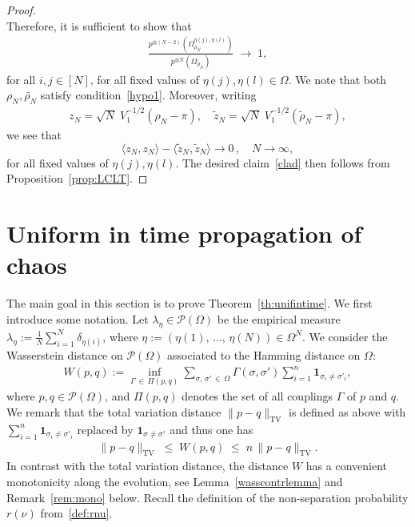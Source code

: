 \documentclass[AHL,Unicode,longabstracts,published]{cedram}
\renewcommand{\leq}{\;\leqslant\;}
\newcommand{\Om}{\Omega}
\newcommand{\si}{\sigma}
\newcommand{\scalar}[2]{\langle #1, #2\rangle}
\newcommand{\tv}{\mathrm{TV}}
\newcommand{\ind}{\mathbf{1}}
\newcommand{\cP}{\mathcal{P}}
\let\r=\rho
\let\G=\Gamma
\let\O=\Omega
\begin{document}
\begin{proof}
\[\]
Therefore, it is sufficient to show that
\begin{align}\label{clad}
\frac{p^{\otimes (N-2)}\left(\Om^{\eta(j),\eta(l)}_{\rho_N}\right)}{p^{\otimes N}\left(\Om_{\rho_N}\right)} \;\to\; 1,
\end{align}
for all $i,j \in [N]$, for all fixed values of $\eta(j),\eta(l)\in\O$. We note that both $\rho_N,\widetilde{\rho_N}$ satisfy condition~\eqref{hypo1}. Moreover, writing
\begin{gather*}
z_N =\sqrt N \;V_1^{-1/2}\left(\r_N - \pi\right),\quad
\widetilde z_N=\sqrt N \;V_1^{-1/2}\left(\widetilde\r_N -\pi\right),
\end{gather*}
we see that
\[
\scalar{z_N}{z_N} -\scalar{\widetilde z_N}{\widetilde z_N} \to 0\,,\quad N\to\infty,
\]
for all fixed values of $\eta(j),\eta(l)$. The desired claim~\eqref{clad} then follows from Proposition~\ref{prop:LCLT}.
\end{proof}


\section{Uniform in time propagation of chaos}\label{sec:unifintime}


The main goal in this section is to prove Theorem~\ref{th:unifintime}. We first introduce some notation. Let $\lambda_{\eta}\in \cP(\O)$ be the empirical measure $\lambda_{\eta}:=\frac1N\sum_{i=1}^N\delta_{\eta(i)}$, where $\eta:=(\eta(1),\,\dots,\,\eta(N))\in\O^N$. We consider the Wasserstein distance on $\cP(\O)$ associated to the Hamming distance on $\O$:
\begin{align}\label{def:W}
W(p,q):= \inf_{\G\,\in\,\Pi(p,q)}\sum_{\si,\,\si'\,\in\,\Om}\G(\si,\si')\sum_{i=1}^n\ind_{\si_i\neq\si'_i},
\end{align}
where $p,q\in\cP(\O)$, and $\Pi(p,q)$ denotes the set of all couplings $\G$ of $p$ and $q$. We remark that the total variation distance $\|p-q\|_\tv$ is defined as above with $\sum_{i=1}^n\ind_{\si_i\neq\si'_i}$ replaced by $\ind_{\si\neq\si'}$ and thus one has
\begin{align}\label{eq:tvW}
\|p-q\|_\tv\leq W(p,q) \leq n\,\|p-q\|_\tv.
\end{align}
In contrast with the total variation distance, the distance $W$ has a convenient monotonicity along the evolution, see Lemma~\ref{wasscontrlemma} and Remark~\ref{rem:mono} below. Recall the definition of the non-separation probability $r(\nu)$ from~\eqref{def:rnu}.
\end{document}
